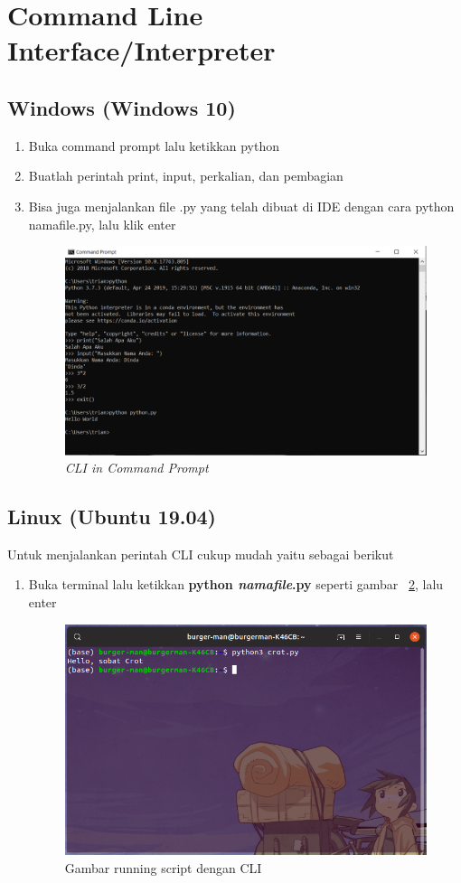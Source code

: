 \section{Command Line Interface/Interpreter}
\subsection{Windows (Windows 10)}
\begin{enumerate}
\item Buka command prompt lalu ketikkan python
\item Buatlah perintah print, input, perkalian, dan pembagian
\item Bisa juga menjalankan file .py yang telah dibuat di IDE dengan cara python namafile.py, lalu klik enter
\begin{figure}[H]
    \centering
    \includegraphics[scale=0.5]{figures/cli (2)}
    \caption{\textit{CLI in Command Prompt}}
    \label{CLI}
\end{figure}
\end{enumerate}

\subsection{Linux (Ubuntu 19.04)}
Untuk menjalankan perintah CLI cukup mudah yaitu sebagai berikut

\begin{enumerate}

\item Buka terminal lalu ketikkan \textbf{python \textit{namafile}.py} seperti gambar ~\ref{cli}, lalu enter
\begin{figure}[H]
\centering
\includegraphics[width=1\textwidth]{figures/cli.png}
\caption{Gambar running script dengan CLI}
\label{cli}
\end{figure}

\end{enumerate}